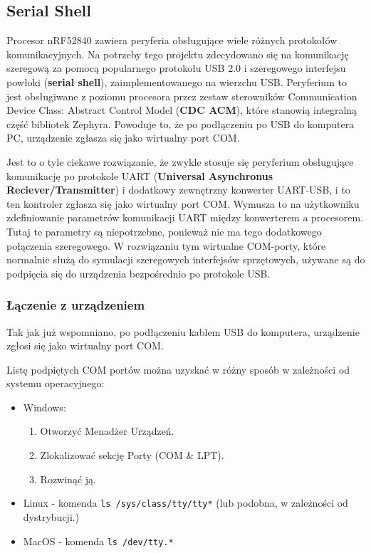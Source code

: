 \subsection{Serial Shell}
\label{cha:usb}
Procesor nRF52840 zawiera peryferia obsługujące wiele różnych protokołów komunikacyjnych. Na potrzeby tego projektu zdecydowano się na komunikację szeregową za pomocą popularnego protokołu USB 2.0 i szeregowego interfejsu powłoki (\textbf{serial shell}), zaimplementowanego na wierzchu USB. Peryferium to jest obsługiwane z poziomu procesora przez zestaw sterowników Communication Device Class: Abstract Control Model (\textbf{CDC ACM}), które stanowią integralną część bibliotek Zephyra. Powoduje to, że po podłączeniu po USB do komputera PC, urządzenie zgłasza się jako wirtualny port COM. \cite{nrf_52840_docs}

Jest to o tyle ciekawe rozwiązanie, że zwykle stosuje się peryferium obsługujące komunikację po protokole UART (\textbf{Universal Asynchronus Reciever/Transmitter}) i dodatkowy zewnętrzny konwerter UART-USB, i to ten kontroler zgłasza się jako wirtualny port COM. Wymusza to na użytkowniku zdefiniowanie parametrów komunikacji UART między konwerterem a procesorem. Tutaj te parametry są niepotrzebne, ponieważ nie ma tego dodatkowego połączenia szeregowego. W rozwiązaniu tym wirtualne COM-porty, które normalnie służą do symulacji szeregowych interfejsów sprzętowych,  używane są do podpięcia się do urządzenia bezpośrednio po protokole USB. \cite{nrf_52840_docs}

\subsubsection{Łączenie z urządzeniem}
\label{cha:COM_connect}
Tak jak już wspomniano, po podłączeniu kablem USB do komputera, urządzenie zgłosi się jako wirtualny port COM.

\begin{minipage}{\textwidth}
Listę podpiętych COM portów można uzyskać w różny sposób w zależności od systemu operacyjnego:
\begin{itemize}
    \item Windows: \cite{identify_com_ports_win}
    \begin{enumerate}
        \item Otworzyć Menadżer Urządzeń.
        \item Zlokalizować sekcję Porty (COM \& LPT).
        \item Rozwinąć ją.
    \end{enumerate}
    \item Linux - komenda \texttt{ls /sys/class/tty/tty*} (lub podobna, w zależności od dystrybucji.) \cite{identify_com_ports_linux}
    \item MacOS - komenda \texttt{ls /dev/tty.*} \cite{identify_com_ports_macos}
\end{itemize}
\end{minipage}


